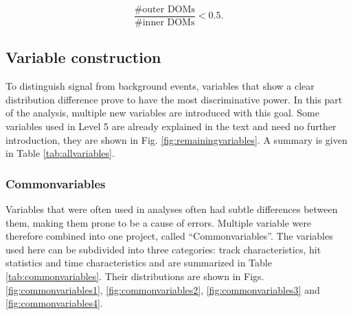 \begin{equation}
\frac{\# \textrm{outer DOMs}}{\#\textrm{inner DOMs}} < 0.5.
\end{equation}

\subsection{Variable construction}
To distinguish signal from background events, variables that show a clear distribution difference prove to have the most discriminative power. In this part of the analysis, multiple new variables are introduced with this goal. Some variables used in Level 5 are already explained in the text and need no further introduction, they are shown in Fig. \ref{fig:remainingvariables}. A summary is given in Table \ref{tab:allvariables}.

\subsubsection{Commonvariables}
\label{subsub:commonvariables}
Variables that were often used in analyses often had subtle differences between them, making them prone to be a cause of errors. Multiple variable were therefore combined into one project, called ``Commonvariables''. The variables used here can be subdivided into three categories: track characteristics, hit statistics and time characteristics and are summarized in Table \ref{tab:commonvariables}. Their distributions are shown in Figs. \ref{fig:commonvariables1}, \ref{fig:commonvariables2}, \ref{fig:commonvariables3} and \ref{fig:commonvariables4}.

